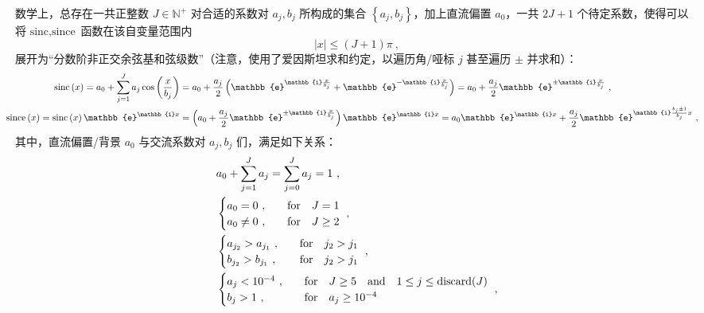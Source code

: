 数学上，总存在一共正整数 $J \in \mathbb{N}^+$ 对合适的系数对 $a_j, b_j$ 所构成的集合 $\left\{ a_j, b_j \right\}$，加上直流偏置 $a_0$，一共 $2J + 1$ 个待定系数，使得可以将 $\text{sinc}, \text{since}$ 函数在该自变量范围内
\begin{equation} \label{eq:2-254}
	\left| x \right| \leq \left( J+1 \right) \pi ~,
\end{equation}
展开为“分数阶非正交余弦基和弦级数”（注意，使用了爱因斯坦求和约定，以遍历角/哑标 $j$ 甚至遍历 $\pm$ 并求和）：
\begin{subequations} \label{eq:2-255}
	\abovedisplayskip=13pt
	\belowdisplayskip=13pt
	\begin{align}
		\hspace{-1em} \text{sinc}\left( x \right) = a_0 + \sum\limits^J_{j=1} {{a_j}\cos \left( \displaystyle{ {\frac{x}{{{b_j}}}} } \right)} &= a_0 + \frac{ a_j }{ 2 } \left( \mathbb{e}^{\mathbb{i}{\frac{x}{b_j}}} + \mathbb{e}^{-\mathbb{i}{\frac{x}{b_j}}} \right) = a_0 + \frac{ a_j }{ 2 } \mathbb{e}^{\pm \mathbb{i} {\frac{x}{b_j}}} \label{eq:2-255a}~, \\ \hspace{-1em} \text{since}\left( x \right) = \text{sinc}\left( x \right) \mathbb{e}^{\mathbb{i}{x}} &= \left( a_0 + \frac{ a_j }{ 2 } \mathbb{e}^{\pm \mathbb{i} {\frac{x}{b_j}}} \right) \mathbb{e}^{\mathbb{i}{x}} = a_0 \mathbb{e}^{\mathbb{i}{x}} + \frac{ a_j }{ 2 } \mathbb{e}^{\mathbb{i} {\frac{b_j \pm 1}{b_j}} x} \label{eq:2-255b}~,
	\end{align}
\end{subequations}
其中，直流偏置/背景 $a_0$ 与交流系数对 $a_j, b_j$ 们，满足如下关系：
\begin{subequations} \label{eq:2-256}
	\abovedisplayskip=13pt
	\belowdisplayskip=13pt
	\begin{align}
		&a_0 + \sum\limits^J_{j=1} a_j = \sum\limits^J_{j=0} a_j = 1 \label{eq:2-256a}~, \\
		&\begin{cases}
			a_0 = 0 ~, &\quad \text{for} \ \ \ J = 1 \\
			a_0 \neq 0 ~, &\quad \text{for} \ \ \ J \geq 2 \\
		\end{cases} \label{eq:2-256b}~, \\
		&\begin{cases}
			a_{j_2} > a_{j_1} ~, &\quad \text{for} \ \ \ j_2 > j_1 \\
			b_{j_2} > b_{j_1} ~, &\quad \text{for} \ \ \ j_2 > j_1 \\
		\end{cases} \label{eq:2-256c}~, \\
		&\begin{cases}
			a_j < 10^{-4} ~, &\quad \text{for} \ \ \ J \geq 5 \ \ \ \text{and} \ \ \ 1 \leq j 	\leq \text{discard}(J) \\
			b_j > 1 ~, &\quad \text{for} \ \ \ a_j \geq 10^{-4} \\
		\end{cases} \label{eq:2-256d}~,
	\end{align}
\end{subequations}
